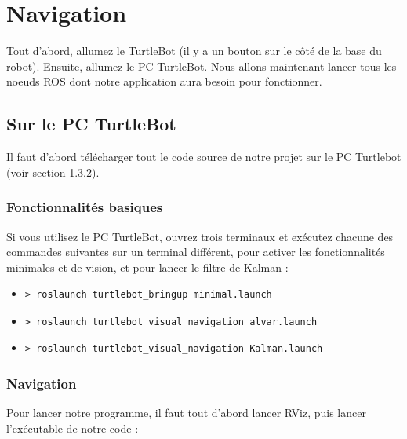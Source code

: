 \documentclass[10pt,a4paper]{article}
\begin{document}
\newpage
\section{Navigation}
\label{sec:Navigation}

Tout d'abord, allumez le TurtleBot (il y a un bouton sur le côté de la base du robot). Ensuite, allumez le PC TurtleBot. Nous allons maintenant lancer tous les noeuds ROS dont notre application aura besoin pour fonctionner.

\subsection{Sur le PC TurtleBot}

Il faut d'abord télécharger tout le code source de notre projet sur le PC Turtlebot (voir section 1.3.2).

\subsubsection{Fonctionnalités basiques}
\label{sec:navigation2}

Si vous utilisez le PC TurtleBot, ouvrez trois terminaux et exécutez chacune des commandes suivantes sur un terminal différent, pour activer les fonctionnalités minimales et de vision, et pour lancer le filtre de Kalman :

\begin{itemize}
\item[]  \begin{verbatim}> roslaunch turtlebot_bringup minimal.launch \end{verbatim}
\item[]  \begin{verbatim}> roslaunch turtlebot_visual_navigation alvar.launch \end{verbatim}
\item[]  \begin{verbatim}> roslaunch turtlebot_visual_navigation Kalman.launch \end{verbatim}
\end{itemize}

\subsubsection{Navigation}
\label{sec:navigation}

Pour lancer notre programme, il faut tout d'abord lancer RViz, puis lancer l'exécutable de notre code :
\end{document}
